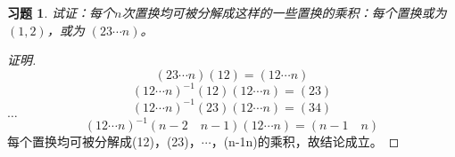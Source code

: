 \documentclass{article}
\begin{document}
\begin{CJK}{UTF8}{gbsn}
\newtheorem*{Ex}{习题}
  \begin{Ex}
  试证：每个$n$次置换均可被分解成这样的一些置换的乘积：每个置换或为$(1,2)$，或为
  $(23\cdots n)$。  
  \end{Ex}
  \begin{proof}[证明]
    \[(23\cdots n)(12) = (12\cdots n)\]
    \[(12\cdots n)^{-1}(12)(12\cdots n) = (23)\]
    \[(12\cdots n)^{-1}(23)(12\cdots n) = (34)\]
    $\ldots$
    \[(12\cdots n)^{-1}(n-2 \quad n-1)(12\cdots n) = (n-1 \quad n)\]
    每个置换均可被分解成(12)，(23)，$\cdots$，(n-1\quad n)的乘积，故结论成立。
  \end{proof}
\end{CJK}
\end{document}
